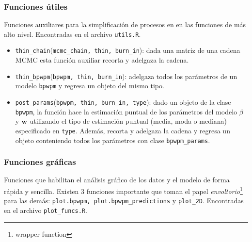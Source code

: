 \documentclass[../../Main/Main.tex]{subfiles}
\begin{document}
\subsubsection*{Funciones útiles}
Funciones auxiliares para la simplificación de procesos en en las funciones de más alto nivel. Encontradas en el archivo \verb|utils.R|.
\begin{itemize}[label={}]
	\item \verb|thin_chain|(\verb|mcmc_chain, thin, burn_in|): dada una matriz de una cadena MCMC esta función auxiliar recorta y adelgaza la cadena.
	\item \verb|thin_bpwpm|(\verb|bpwpm, thin, burn_in|): adelgaza todos los parámetros de un modelo \verb|bpwpm| y regresa un objeto del mismo tipo. 
	\item \verb|post_params|(\verb|bpwpm, thin, burn_in, type|): dado un objeto de la clase \verb|bpwpm|, la función hace la estimación puntual de los parámetros del modelo $\beta$ y $\mathbf{w}$ utilizando el tipo de estimación puntual (media, moda o mediana) especificado en \verb|type|. Además, recorta y adelgaza la cadena y regresa un objeto conteniendo todos los parámetros con clase \verb|bpwpm_params|.
\end{itemize}

\subsubsection*{Funciones gráficas}
Funciones que habilitan el análisis gráfico de los datos y el modelo de forma rápida y sencilla. Existen 3 funciones importante que toman el papel \textit{envoltorio}\footnote{wrapper function} para las demás: \verb|plot.bpwpm, plot.bpwpm_predictions| y \verb|plot_2D|. Encontradas en el archivo \verb|plot_funcs.R|.
\end{document}

